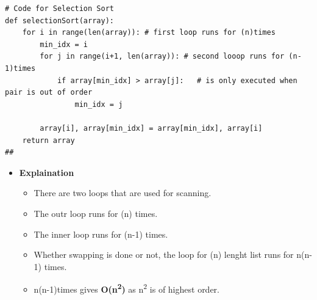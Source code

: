 \documentclass{article}
\begin{document}
\begin{verbatim}
# Code for Selection Sort
def selectionSort(array):
    for i in range(len(array)): # first loop runs for (n)times
        min_idx = i
        for j in range(i+1, len(array)): # second looop runs for (n-1)times
            if array[min_idx] > array[j]:   # is only executed when pair is out of order
                min_idx = j
    
        array[i], array[min_idx] = array[min_idx], array[i]
    return array
##  
\end{verbatim}
\begin{itemize}
    \item \textbf{Explaination}
    \begin{itemize}
        \item There are two loops that are used for scanning.
        \item The outr loop runs for (n) times.
        \item The inner loop runs for (n-1) times.
        \item Whether swapping is done or not, the loop for (n) lenght list runs for n(n-1) times.
        \item n(n-1)times gives \textbf{O(n\textsuperscript{2})} as n\textsuperscript{2} is of highest order.
        \end{itemize}
\end{itemize}


\clearpage
\end{document}
